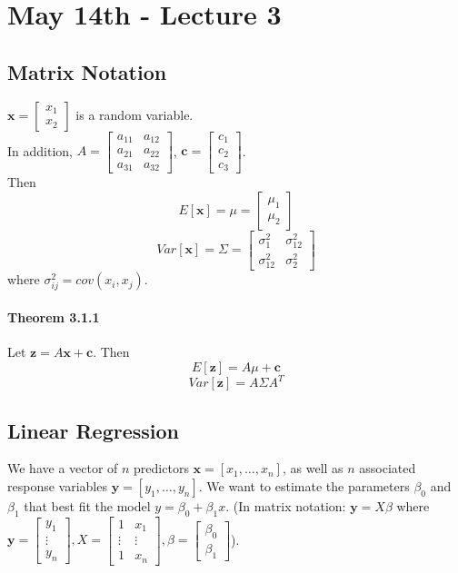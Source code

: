 \documentclass[11pt]{article}
\newcommand{\tb}[1]{\textbf{#1}}
\newcommand{\vx}[0]{\tb{x}}
\newcommand{\vy}[0]{\tb{y}}
\newcommand{\vz}[0]{\tb{z}}
\newcommand{\vc}[0]{\tb{c}}
\begin{document}
\section{May 14th - Lecture 3}
\subsection{Matrix Notation}
$\vx = \begin{bmatrix}
	x_1 \\ x_2
\end{bmatrix}$ is a random variable. \\In addition, $A = \begin{bmatrix}
	a_{11} & a_{12} \\ a_{21} & a_{22} \\ a_{31} & a_{32}
\end{bmatrix}$, $\vc = \begin{bmatrix}
	c_1\\c_2\\c_3
\end{bmatrix}$.\\
Then $$E[\vx] = \mu = \begin{bmatrix}
	\mu_1 \\ \mu_2
\end{bmatrix}$$
$$Var[\vx] = \Sigma = \begin{bmatrix}
	\sigma^2_1 & \sigma^2_{12} \\ \sigma^2_{12} & \sigma^2_2
\end{bmatrix}$$
where $\sigma^2_{ij} = cov(x_i, x_j)$.
\paragraph{Theorem 3.1.1}
Let $\vz = A\vx + \vc$. Then $$E[\vz] = A\mu + \vc$$
$$Var[\vz] = A\Sigma A^T$$
\subsection{Linear Regression}
We have a vector of $n$ predictors $\vx = [x_1,\hdots,x_n]$, as well as $n$ associated response variables $\vy = [y_1, \hdots, y_n]$. We want to estimate the parameters $\beta_0$ and $\beta_1$ that best fit the model $y = \beta_0 + \beta_1 x$. (In matrix notation: $\vy = X\beta$ where $\vy = \begin{bmatrix}
	y_1 \\ \vdots \\ y_n \end{bmatrix}, X = \begin{bmatrix}
		1 & x_1 \\ \vdots & \vdots \\ 1 & x_n
	\end{bmatrix}, \beta = \begin{bmatrix} \beta_0 \\ \beta_1 \end{bmatrix}$).
\end{document}
